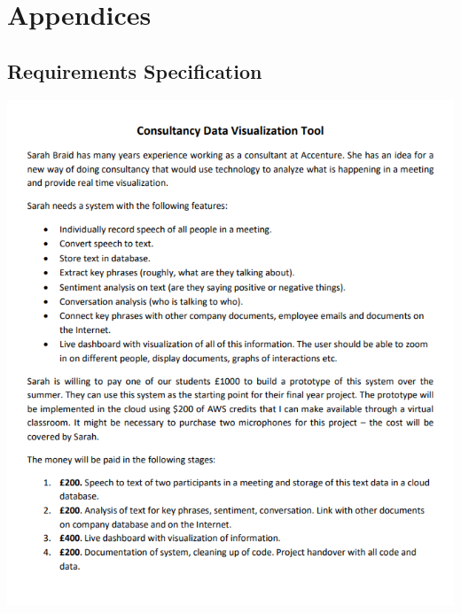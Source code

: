 \documentclass{article}
\begin{document}
\pagebreak
{}
\printbibliography

\newpage
\appendix
\section*{Appendices}
\renewcommand{\thesubsection}{\Alph{subsection}}

\subsection{Requirements Specification}
\includegraphics[width=1\linewidth]{img/sarah.png}
\label{fig:sarah}
\end{document}
